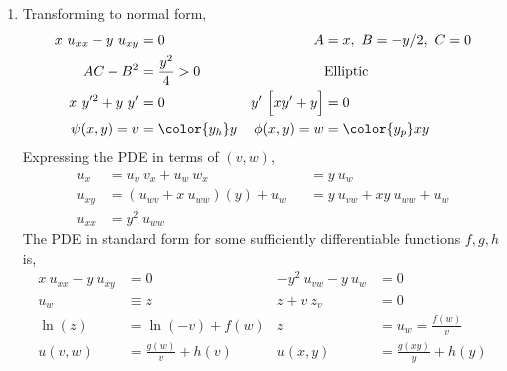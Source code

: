 \begin{enumerate}
    \item Transforming to normal form,
          \begin{align}
              x\ u_{xx} - y\ u_{xy}   & = 0                    &
              A                       & = x,\ B = -y/2,\ C = 0   \\
              AC - B^2                & = \frac{y^2}{4} > 0    &
                                      & \text{Elliptic}          \\
              x\ y'^2 + y\ y'         & = 0                    &
              y'\ \Big[ xy' + y \Big] & = 0                      \\
              \psi(x, y) = v          & = \color{y_h} y        &
              \phi(x, y) = w          & = \color{y_p} xy
          \end{align}
          Expressing the PDE in terms of $ (v, w) $,
          \begin{align}
              u_{x}  & = u_v\ v_x + u_w\ w_x           &
                     & = y\ u_w                          \\
              u_{xy} & = (u_{wv} + x\ u_{ww})(y) + u_w &
                     & = y\ u_{vw} + xy\ u_{ww} + u_w    \\
              u_{xx} & = y^2\ u_{ww}
          \end{align}
          The PDE in standard form for some sufficiently differentiable functions
          $ f, g, h $ is,
          \begin{align}
              x\ u_{xx} - y\ u_{xy}  & = 0                      &
              - y^2\ u_{vw} - y\ u_w & = 0                        \\
              u_w                    & \equiv z                 &
              z + v\ z_v             & = 0                        \\
              \ln(z)                 & = \ln(-v) + f(w)         &
              z                      & = u_w = \frac{f(w)}{v}     \\
              u(v, w)                & = \frac{g(w)}{v} + h(v)  &
              u(x, y)                & = \frac{g(xy)}{y} + h(y)
          \end{align}


\end{enumerate}
